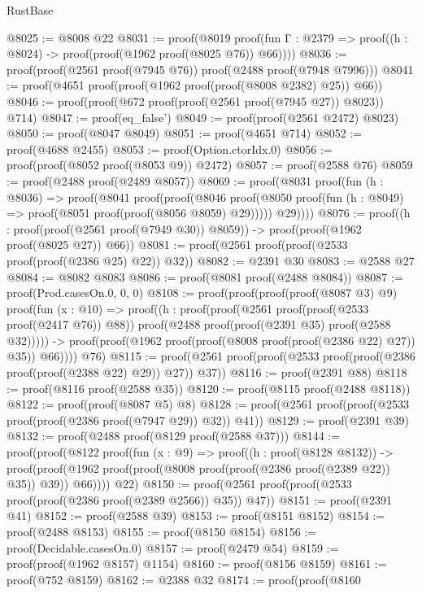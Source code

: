 \begin{lexlean}{RustBase}
\begin{coremodule}
@8025 := @8008 @22
@8031 := proof(@8019
      proof(fun {Γ : @2379} => proof((h : @8024) -> proof(proof(@1962 proof(@8025 @76)) @66))))
@8036 := proof(proof(@2561 proof(@7945 @76)) proof(@2488 proof(@7948 @7996)))
@8041 := proof(@4651 proof(proof(@1962 proof(proof(@8008 @2382) @25)) @66))
@8046 := proof(proof(@672 proof(proof(@2561 proof(@7945 @27)) @8023)) @714)
@8047 := proof(eq_false')
@8049 := proof(proof(@2561 @2472) @8023)
@8050 := proof(@8047 @8049)
@8051 := proof(@4651 @714)
@8052 := proof(@4688 @2455)
@8053 := proof(Option.ctorIdx.{0})
@8056 := proof(proof(@8052 proof(@8053 @9)) @2472)
@8057 := proof(@2588 @76)
@8059 := proof(@2488 proof(@2489 @8057))
@8069 := proof(@8031
      proof(fun (h : @8036) =>
        proof(@8041
            proof(proof(@8046
                  proof(@8050 proof(fun (h : @8049) => proof(@8051 proof(proof(@8056 @8059) @29)))))
                @29))))
@8076 := proof((h : proof(proof(@2561 proof(@7949 @30)) @8059)) ->
    proof(proof(@1962 proof(@8025 @27)) @66))
@8081 := proof(@2561 proof(proof(@2533 proof(proof(@2386 @25) @22)) @32))
@8082 := @2391 @30
@8083 := @2588 @27
@8084 := @8082 @8083
@8086 := proof(@8081 proof(@2488 @8084))
@8087 := proof(Prod.casesOn.{0, 0, 0})
@8108 := proof(proof(proof(proof(@8087 @3) @9)
        proof(fun (x : @10) =>
          proof((h : proof(proof(@2561 proof(proof(@2533 proof(@2417 @76)) @88))
                proof(@2488 proof(proof(@2391 @35) proof(@2588 @32))))) ->
            proof(proof(@1962 proof(proof(@8008 proof(proof(@2386 @22) @27)) @35)) @66))))
      @76)
@8115 := proof(@2561 proof(proof(@2533 proof(proof(@2386 proof(proof(@2388 @22) @29)) @27)) @37))
@8116 := proof(@2391 @88)
@8118 := proof(@8116 proof(@2588 @35))
@8120 := proof(@8115 proof(@2488 @8118))
@8122 := proof(proof(@8087 @5) @8)
@8128 := proof(@2561 proof(proof(@2533 proof(proof(@2386 proof(@7947 @29)) @32)) @41))
@8129 := proof(@2391 @39)
@8132 := proof(@2488 proof(@8129 proof(@2588 @37)))
@8144 := proof(proof(@8122
        proof(fun (x : @9) =>
          proof((h : proof(@8128 @8132)) ->
            proof(proof(@1962 proof(proof(@8008 proof(proof(@2386 proof(@2389 @22)) @35)) @39))
                @66))))
      @22)
@8150 := proof(@2561 proof(proof(@2533 proof(proof(@2386 proof(@2389 @2566)) @35)) @47))
@8151 := proof(@2391 @41)
@8152 := proof(@2588 @39)
@8153 := proof(@8151 @8152)
@8154 := proof(@2488 @8153)
@8155 := proof(@8150 @8154)
@8156 := proof(Decidable.casesOn.{0})
@8157 := proof(@2479 @54)
@8159 := proof(proof(@1962 @8157) @1154)
@8160 := proof(@8156 @8159)
@8161 := proof(@752 @8159)
@8162 := @2388 @32
@8174 := proof(proof(@8160

\end{coremodule}
\end{lexlean}
